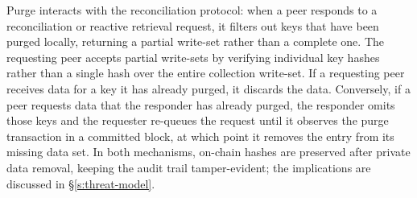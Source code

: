 Purge interacts with the reconciliation protocol: when a peer responds to a reconciliation or reactive retrieval request, it filters out keys that have been purged locally, returning a partial write-set rather than a complete one. The requesting peer accepts partial write-sets by verifying individual key hashes rather than a single hash over the entire collection write-set. If a requesting peer receives data for a key it has already purged, it discards the data. Conversely, if a peer requests data that the responder has already purged, the responder omits those keys and the requester re-queues the request until it observes the purge transaction in a committed block, at which point it removes the entry from its missing data set.
In both mechanisms, on-chain hashes are preserved after private data removal, keeping the audit trail tamper-evident; the implications are discussed in \S\ref{s:threat-model}.
